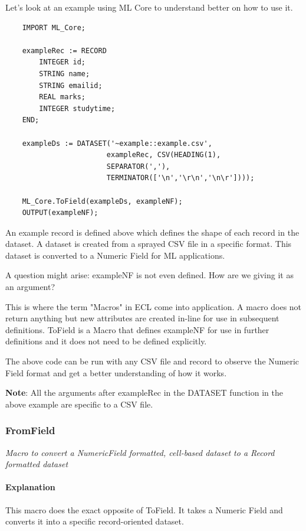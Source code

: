 \documentclass[a4paper,oneside,12pt]{book}
\begin{document}
Let's look at an example using ML Core to understand better on how to use it.

\begin{lstlisting}
    IMPORT ML_Core;
    
    exampleRec := RECORD
        INTEGER id;
        STRING name;
        STRING emailid;
        REAL marks;
        INTEGER studytime;
    END;
    
    exampleDs := DATASET('~example::example.csv', 
                        exampleRec, CSV(HEADING(1),
                        SEPARATOR(','),
                        TERMINATOR(['\n','\r\n','\n\r'])));
    
    ML_Core.ToField(exampleDs, exampleNF);
    OUTPUT(exampleNF);
\end{lstlisting}

An example record is defined above which defines the shape of each record in the dataset. A dataset is created from a sprayed CSV file in a specific format. This dataset is converted to a Numeric Field for ML applications.

A question might arise: exampleNF is not even defined. How are we giving it as an argument?

This is where the term "Macros" in ECL come into application. A macro does not return anything but new attributes are created in-line for use in subsequent definitions. ToField is a Macro that defines exampleNF for use in further definitions and it does not need to be defined explicitly.

The above code can be run with any CSV file and record to observe the Numeric Field format and get a better understanding of how it works.

\textbf{Note}: All the arguments after exampleRec in the DATASET function in the above example are specific to a CSV file.

\subsubsection{FromField}\label{mlcore:fromfield}

\textit{Macro to convert a NumericField formatted, cell-based dataset to a Record formatted dataset}

\paragraph{Explanation}

This macro does the exact opposite of ToField. It takes a Numeric Field and converts it into a specific record-oriented dataset. 
\end{document}
